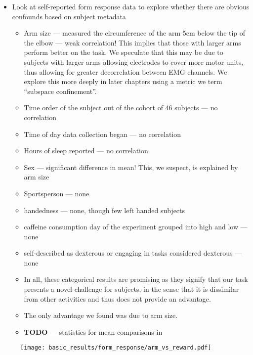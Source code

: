 \documentclass[../main.tex]{subfiles}
\begin{document}
\begin{itemize}
    \setlength\itemsep{0em}
    \item Look at self-reported form response data to explore whether there are obvious confounds based on subject metadata
    \begin{itemize}
        \item Arm size --- measured the circumference of the arm 5cm below the tip of the elbow --- weak correlation! This implies that those with larger arms perform better on the task. We speculate that this may be due to subjects with larger arms allowing electrodes to cover more motor units, thus allowing for greater decorrelation between EMG channels. We explore this more deeply in later chapters using a metric we term ``subspace confinement''.
        \item Time order of the subject out of the cohort of 46 subjects --- no correlation
        \item Time of day data collection began --- no correlation
        \item Hours of sleep reported --- no correlation
        \item Sex --- significant difference in mean! This, we suspect, is explained by arm size
        \item Sportsperson --- none 
        \item handedness --- none, though few left handed subjects
        \item caffeine consumption day of the experiment grouped into high and low --- none 
        \item self-described as dexterous or engaging in tasks considered dexterous --- none
        \item In all, these categorical results are promising as they signify that our task presents a novel challenge for subjects, in the sense that it is dissimilar from other activities and thus does not provide an advantage.
        \item The only advantage we found was due to arm size.
        \item \textbf{TODO} --- statistics for mean comparisons in 
    \end{itemize}
\end{itemize}


\begin{figure}[H]%
    \centering
    \texttt{[image: basic\_results/form\_response/arm\_vs\_reward.pdf]}
    \caption[Arm versus reward]{}\label{fig:arm_vs_reward}
\end{figure}
\end{document}
